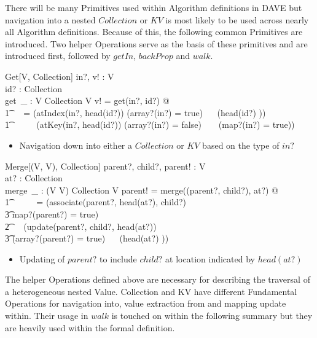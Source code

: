 \documentclass[../main.tex]{subfiles}
\begin{document}
There will be many Primitives used within Algorithm definitions in DAVE but
navigation into a nested $Collection$ or $KV$ is most likely to be used
across nearly all Algorithm definitions. Because of this, the following
common Primitives are introduced. Two helper Operations serve as the basis of
these primitives and are introduced first, followed by $getIn$, $backProp$ and $walk$.

\begin{schema}{Get[V, Collection]}
  in?, v! : V \\
  id? : Collection \\
  get~\_ : V \cross Collection \surj V
  \where
  v! = get(in?, id?) @\\
  \t1 \ ~  = (atIndex(in?, head(id?)) \iff (array?(in?) = true) ~\land~ (head(id?) \in \nat)) ~\lor \\
  \t1 \ \ \ \ ~ (atKey(in?, head(id?)) \iff (array?(in?) = false) ~ \land ~ (map?(in?) = true))
\end{schema}
\begin{itemize}
  \item Navigation down into either a $Collection$ or $KV$ based on the type of $in?$
\end{itemize}
\begin{schema}{Merge[(V, V), Collection]}
  parent?, child?, parent! : V \\
  at? : Collection \\
  merge~\_ : (V \cross V) \cross Collection \bij V
  \where
  parent! = merge((parent?, child?), at?) @ \\
  \t1 \ \ \ \ ~ = (associate(parent?, head(at?), child?) \\
  \t3 \iff map?(parent?) = true) ~ \lor \\
  \t2 \ ~ (update(parent?, child?, head(at?)) \\
  \t3 \iff (array?(parent?) = true) ~\land~ (head(at?) \in \nat))
\end{schema}
\begin{itemize}
  \item Updating of $parent?$ to include $child?$ at location indicated by $head(at?)$
\end{itemize}
The helper Operations defined above are necessary for describing
the traversal of a heterogeneous nested Value. Collection and KV have
different Fundamental Operations for navigation into, value extraction from
and mapping update within. Their usage in $walk$ is touched on within the following
summary but they are heavily used within the formal definition.
\end{document}

